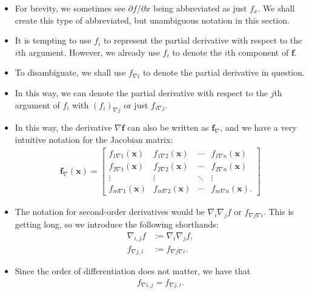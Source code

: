 \documentclass[10pt]{article}
\newcommand{\ve}[1]{\mathbf{#1}}
\begin{document}
\begin{itemize}
  \item For brevity, we sometimes see $\partial f / \partial x$ being abbreviated as just $f_x$. We shall create this type of abbreviated, but unambiguous notation in this section.
  
  \item It is tempting to use $f_i$ to represent the partial derivative with respect to the $i$th argument. However, we already use $f_i$ to denote the $i$th component of $\ve{f}$.
  
  \item To disambiguate, we shall use $f_{\nabla i}$ to denote the partial derivative in question.
  
  \item In this way, we can denote the partial derivative with respect to the $j$th argument of $f_i$ with $(f_i)_{\nabla j}$ or just $f_{i \nabla j}$.
  
  \item In this way, the derivative $\nabla \ve{f}$ can also be written as $\ve{f}_\nabla$, and we have a very intuitive notation for the Jacobian matrix:
  \begin{align*}
    \ve{f}_{\nabla}(\ve{x}) 
    = \begin{bmatrix}
      f_{1\nabla 1}(\ve{x}) & f_{1\nabla 2}(\ve{x}) & \cdots & f_{1\nabla n}(\ve{x}) \\
      f_{2\nabla 1}(\ve{x}) & f_{2\nabla 2}(\ve{x}) & \cdots & f_{2\nabla n}(\ve{x}) \\
      \vdots & \vdots & \ddots & \vdots \\
      f_{m\nabla 1}(\ve{x}) & f_{m\nabla 2}(\ve{x}) & \cdots & f_{m\nabla n}(\ve{x}).
    \end{bmatrix}
  \end{align*}

  \item The notation for second-order derivatives would be $\nabla_i \nabla_j f$ or $f_{\nabla j \nabla i}$. This is getting long, so we introduce the following shorthands:
  \begin{align*}
    \nabla_{i,j} f &:= \nabla_i \nabla_j f, \\
    f_{\nabla j, i} &:= f_{\nabla j \nabla i}. 
  \end{align*}

  \item Since the order of differentiation does not matter, we have that
  \begin{align*}
    f_{\nabla i,j} = f_{\nabla j,i}.
  \end{align*}
\end{itemize}


  
\end{document}
